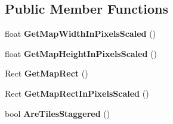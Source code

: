 \subsection*{Public Member Functions}
\begin{DoxyCompactItemize}
\item 
\mbox{\label{class_tiled2_unity_1_1_tiled_map_ad78f1e4e5bb593c9f6e2475694699551}} 
float {\bfseries Get\+Map\+Width\+In\+Pixels\+Scaled} ()
\item 
\mbox{\label{class_tiled2_unity_1_1_tiled_map_adefe738f0c07edfbd65bf4f08cb85a2e}} 
float {\bfseries Get\+Map\+Height\+In\+Pixels\+Scaled} ()
\item 
\mbox{\label{class_tiled2_unity_1_1_tiled_map_aba80a33188bdec8817437d139ab38a28}} 
Rect {\bfseries Get\+Map\+Rect} ()
\item 
\mbox{\label{class_tiled2_unity_1_1_tiled_map_a3c2a17fcdb0e1dd442c2b65ba90ba929}} 
Rect {\bfseries Get\+Map\+Rect\+In\+Pixels\+Scaled} ()
\item 
\mbox{\label{class_tiled2_unity_1_1_tiled_map_a75f0eef03671de5ec3417e9404f1a050}} 
bool {\bfseries Are\+Tiles\+Staggered} ()
\end{DoxyCompactItemize}
